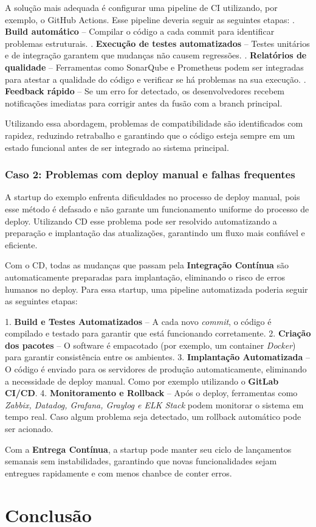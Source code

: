 \documentclass[a4paper,12pt]{article}
\begin{document}
A solução mais adequada é configurar uma pipeline de CI utilizando, por exemplo, o GitHub Actions. Esse pipeline deveria seguir as seguintes etapas:  . \textbf{Build automático} – Compilar o código a cada commit para identificar problemas estruturais.  . \textbf{Execução de testes automatizados} – Testes unitários e de integração garantem que mudanças não causem regressões.  . \textbf{Relatórios de qualidade} – Ferramentas como SonarQube e Prometheus podem ser integradas para atestar a qualidade do código e verificar se há problemas na sua execução.  . \textbf{Feedback rápido} – Se um erro for detectado, os desenvolvedores recebem notificações imediatas para corrigir antes da fusão com a branch principal.  \newline

Utilizando essa abordagem, problemas de compatibilidade são identificados com rapidez, reduzindo retrabalho e garantindo que o código esteja sempre em um estado funcional antes de ser integrado ao sistema principal.  

\subsubsection*{Caso 2: Problemas com deploy manual e falhas frequentes}  
A startup do exemplo enfrenta dificuldades no processo de deploy manual, pois esse método é defasado e não garante um funcionamento uniforme do processo de deploy. Utilizando CD esse problema pode ser resolvido automatizando a preparação e implantação das atualizações, garantindo um fluxo mais confiável e eficiente.  

Com o CD, todas as mudanças que passam pela \textbf{Integração Contínua} são automaticamente preparadas para implantação, eliminando o risco de erros humanos no deploy. Para essa startup, uma pipeline automatizada poderia seguir as seguintes etapas:  

1. \textbf{Build e Testes Automatizados} – A cada novo \textit{commit}, o código é compilado e testado para garantir que está funcionando corretamente.  
2. \textbf{Criação dos pacotes} – O software é empacotado (por exemplo, um container \textit{Docker}) para garantir consistência entre os ambientes.  
3. \textbf{Implantação Automatizada} – O código é enviado para os servidores de produção automaticamente, eliminando a necessidade de deploy manual. Como por exemplo utilizando o \textbf{GitLab CI/CD}.  
4. \textbf{Monitoramento e Rollback} – Após o deploy, ferramentas como \textit{Zabbix, Datadog, Grafana, Graylog e ELK Stack} podem monitorar o sistema em tempo real. Caso algum problema seja detectado, um rollback automático pode ser acionado.  

Com a \textbf{Entrega Contínua}, a startup pode manter seu ciclo de lançamentos semanais sem instabilidades, garantindo que novas funcionalidades sejam entregues rapidamente e com menos chanbce de conter erros.  


\newpage{}

\section*{Conclusão}
\lipsum[4] 
\end{document}
